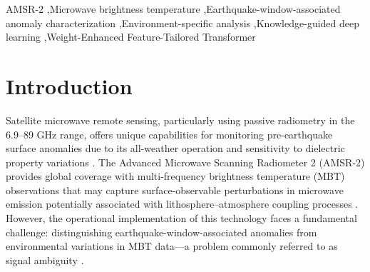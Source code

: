 \documentclass[preprint,review,12pt,authoryear]{elsarticle}
\begin{document}
\begin{frontmatter}
\begin{abstract}
Satellite-based earthquake monitoring using microwave brightness temperature (MBT) is fundamentally challenged by the signal ambiguity problem, where pre-seismic anomalies are difficult to distinguish from non-seismic environmental variations. We address this challenge by developing an environment-specific, knowledge-guided deep learning framework to analyze Advanced Microwave Scanning Radiometer 2 (AMSR-2) data. Our approach first classifies the Earth's surface into five distinct environmental zones. Within each zone, we use association rule mining to discover statistically significant, zone-dependent anomaly signatures (e.g., specific 89 GHz H-polarization patterns over marine environments). This knowledge is then integrated into a novel Weight-Enhanced Feature-Tailored Transformer (WE-FTT) model to guide its focus. Validated on a dataset of 346.56 million MBT measurements across 154 major earthquakes (M$\ge$7.0, 2013-2023), the WE-FTT achieves a Matthews Correlation Coefficient of approximately 0.84, significantly outperforming conventional global methods. This environment-specific approach transforms satellite earthquake monitoring from an ambiguous global analysis into a statistically testable, context-aware anomaly characterization system. This methodology advances satellite-based geohazard assessment and provides a foundation for reproducible monitoring and evaluation protocols.
\end{abstract}

\begin{keyword}
AMSR-2 \sep Microwave brightness temperature \sep Earthquake-window-associated anomaly characterization \sep Environment-specific analysis \sep Knowledge-guided deep learning \sep Weight-Enhanced Feature-Tailored Transformer
\end{keyword}

\end{frontmatter}


\section{Introduction} 
Satellite microwave remote sensing, particularly using passive radiometry in the 6.9--89 GHz range, offers unique capabilities for monitoring pre-earthquake surface anomalies due to its all-weather operation and sensitivity to dielectric property variations \citep{pulinetsLithosphereAtmosphereIonosphere2011,wuGEOSSbasedThermalParameters2012}. The Advanced Microwave Scanning Radiometer 2 (AMSR-2) provides global coverage with multi-frequency brightness temperature (MBT) observations that may capture surface-observable perturbations in microwave emission potentially associated with lithosphere--atmosphere coupling processes \citep{kawanishiAdvancedMicrowaveScanning2003}. However, the operational implementation of this technology faces a fundamental challenge: distinguishing earthquake-window-associated anomalies from environmental variations in MBT data---a problem commonly referred to as signal ambiguity \citep{troninRemoteSensingEarthquakes2006,tramutoliRobustSatelliteTechniques2013}.
\end{document}
